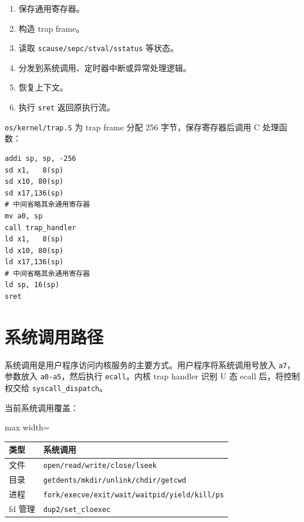 \documentclass[UTF8,a4paper,12pt,openany,fontset=fandol]{ctexrep}
\begin{document}
\begin{enumerate}
\item 保存通用寄存器。
\item 构造 trap frame。
\item 读取 \nolinkurl{scause/sepc/stval/sstatus} 等状态。
\item 分发到系统调用、定时器中断或异常处理逻辑。
\item 恢复上下文。
\item 执行 \nolinkurl{sret} 返回原执行流。
\end{enumerate}

\nolinkurl{os/kernel/trap.S} 为 trap frame 分配 256 字节，保存寄存器后调用 C 处理函数：

\begin{lstlisting}
addi sp, sp, -256
sd x1,   8(sp)
sd x10, 80(sp)
sd x17,136(sp)
# 中间省略其余通用寄存器
mv a0, sp
call trap_handler
ld x1,   8(sp)
ld x10, 80(sp)
ld x17,136(sp)
# 中间省略其余通用寄存器
ld sp, 16(sp)
sret
\end{lstlisting}

\section{系统调用路径}

系统调用是用户程序访问内核服务的主要方式。用户程序将系统调用号放入 \nolinkurl{a7}，参数放入 \nolinkurl{a0-a5}，然后执行 \nolinkurl{ecall}。内核 trap handler 识别 U 态 ecall 后，将控制权交给 \nolinkurl{syscall_dispatch}。

当前系统调用覆盖：

\begin{table}[H]
\centering
\small
\begin{adjustbox}{max width=\textwidth}
\begin{tabularx}{\textwidth}{>{\raggedright\arraybackslash}X>{\raggedright\arraybackslash}X}
\toprule
\textbf{类型} & \textbf{系统调用} \\
\midrule
文件 & \nolinkurl{open/read/write/close/lseek} \\
目录 & \nolinkurl{getdents/mkdir/unlink/chdir/getcwd} \\
进程 & \nolinkurl{fork/execve/exit/wait/waitpid/yield/kill/ps} \\
fd 管理 & \nolinkurl{dup2/set_cloexec} \\
\bottomrule
\end{tabularx}
\end{adjustbox}
\end{table}
\end{document}
